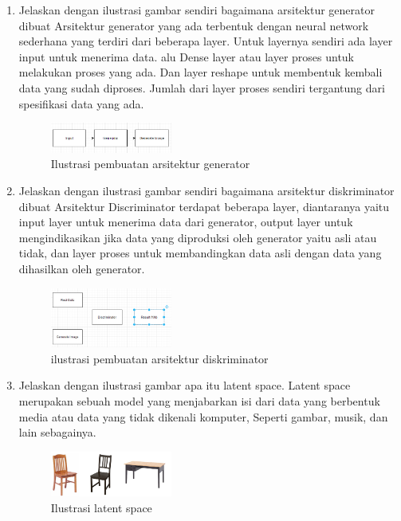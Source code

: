 \begin{enumerate}
	\item Jelaskan dengan ilustrasi gambar sendiri bagaimana arsitektur generator dibuat
	\hfill\break
	Arsitektur generator yang ada terbentuk dengan neural network sederhana yang terdiri dari beberapa layer. Untuk layernya sendiri ada layer input untuk menerima data. alu Dense layer atau layer proses untuk melakukan proses yang ada. Dan layer reshape untuk membentuk kembali data yang sudah diproses. Jumlah dari layer proses sendiri tergantung dari spesiﬁkasi data yang ada.
    \begin{figure}[H]
        \centering
            \includegraphics[width=4cm]{figures/1174077/8/t3.PNG}
            \caption{Ilustrasi pembuatan arsitektur generator}
        \end{figure}

	\item Jelaskan dengan ilustrasi gambar sendiri bagaimana arsitektur diskriminator dibuat
	\hfill\break
	Arsitektur Discriminator terdapat beberapa layer, diantaranya yaitu input layer untuk menerima data dari generator, output layer untuk mengindikasikan jika data yang diproduksi oleh generator yaitu asli atau tidak, dan layer proses untuk membandingkan data asli dengan data yang dihasilkan oleh generator.
    \begin{figure}[H]
	\centering
		\includegraphics[width=4cm]{figures/1174077/8/t4.PNG}
		\caption{ilustrasi pembuatan arsitektur diskriminator}
	\end{figure}

	\item Jelaskan dengan ilustrasi gambar apa itu latent space.
	\hfill\break
	Latent space merupakan sebuah model yang menjabarkan isi dari data yang berbentuk media atau data yang tidak dikenali komputer, Seperti gambar, musik, dan lain sebagainya.
	\begin{figure}[H]
	\centering
		\includegraphics[width=4cm]{figures/1174077/8/t5.PNG}
		\caption{Ilustrasi latent space}
	\end{figure}


\end{enumerate}
